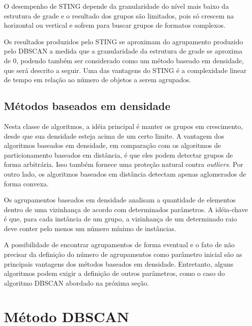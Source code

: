 O desempenho de STING depende da granularidade do nível mais baixo da estrutura de grade e o resultado dos
grupos são limitados, pois só crescem na horizontal ou vertical e sofrem para buscar grupos de formatos complexos.

Os resultados produzidos pelo STING se aproximam do agrupamento produzido pelo
DBSCAN a medida que a granularidade da estrutura de grade se aproxima de 0, podendo
também ser considerado como um método baseado em densidade, que será descrito a seguir.
Uma das vantagens do STING é a complexidade linear de tempo em relação ao número de objetos
a serem agrupados.

\subsection{Métodos baseados em densidade}
Nesta classe de algoritmos, a idéia principal é manter os grupos em crescimento, desde que sua densidade esteja acima de um certo limite. A vantagem dos algoritmos baseados em densidade, em comparação com os algoritmos de particionamento baseados em distância, é que eles podem detectar grupos de forma arbitrária. Isso também fornece uma proteção natural contra \textit{outliers}. Por outro lado, os algoritmos baseados em distância detectam apenas aglomerados de forma convexa.

Os agrupamentos baseados em densidade analisam a quantidade de elementos dentro de uma vizinhança de acordo com determinados parâmetros. A idéia-chave é que, para cada instância de um grupo, a vizinhança de um determinado raio deve conter pelo menos um número mínimo de instâncias.

A possibilidade de encontrar agrupamentos de forma eventual e o fato de não precisar da definição do número de agrupamentos \cite{yip2005} como parâmetro inicial são as principais vantagens dos métodos baseados em densidade. Entretanto, alguns algoritmos podem exigir a definição de outros parâmetros, como o caso do algoritmo DBSCAN \cite{ESTER1996} abordado na próxima seção.

\section{Método DBSCAN}
\label{dbscan}

